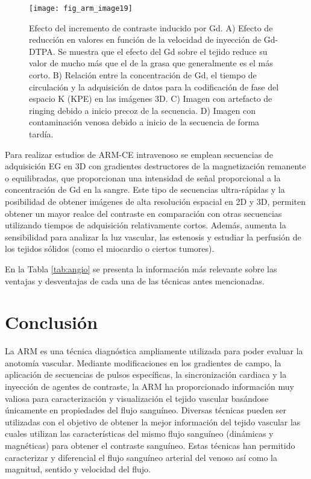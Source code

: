 \begin{figure}[htbp]
\begin{figg}
 \texttt{[image: fig\_arm\_image19]}
 \caption{
Efecto del incremento de contraste inducido por Gd. A) Efecto de reducción en valores \Tone en función de la velocidad de inyección de Gd-DTPA. Se muestra que el efecto del Gd sobre el tejido reduce su valor de \Tone mucho más que el de la grasa que generalmente es el más corto. B) Relación entre la concentración de Gd, el tiempo de circulación y la adquisición de datos para la codificación de fase del espacio K (KPE) en las imágenes 3D. C) Imagen con artefacto de ringing debido a inicio precoz de la secuencia. D) Imagen con contaminación venosa debido a inicio de la secuencia de forma tardía. 
 }
 \label{fig:arm_image19}
\end{figg}
\end{figure}



Para realizar estudios de ARM-CE intravenoso se emplean secuencias de adquisición EG en 3D con gradientes destructores de la magnetización remanente o equilibradas, que proporcionan una intensidad de señal proporcional a la concentración de Gd en la sangre. Este tipo de secuencias ultra-rápidas y la posibilidad de obtener imágenes de alta resolución espacial en 2D y 3D, permiten obtener un mayor realce del contraste en comparación con otras secuencias utilizando tiempos de adquisición relativamente cortos. Además, aumenta la sensibilidad para analizar la luz vascular, las estenosis y estudiar la perfusión de los tejidos sólidos (como el miocardio o ciertos tumores). 


En la Tabla \ref{tab:angio} se presenta la información más relevante sobre las ventajas y desventajas de cada una de las técnicas antes mencionadas. 



\section{Conclusión }
La ARM es una técnica diagnóstica ampliamente utilizada para poder evaluar la anotomía vascular. Mediante modificaciones en los gradientes de campo, la aplicación de secuencias de pulsos específicas, la sincronización cardiaca y la inyección de agentes de contraste, la ARM ha proporcionado información muy valiosa para caracterización y visualización el tejido vascular basándose únicamente en propiedades del flujo sanguíneo. Diversas técnicas pueden ser utilizadas con el objetivo de obtener la mejor información del tejido vascular las cuales utilizan las características del mismo flujo sanguíneo (dinámicas y magnéticas) para obtener el contraste sanguíneo. Estas técnicas han permitido caracterizar y diferencial el flujo sanguíneo arterial del venoso así como la magnitud, sentido y velocidad del flujo. 





% 
% 

% 

